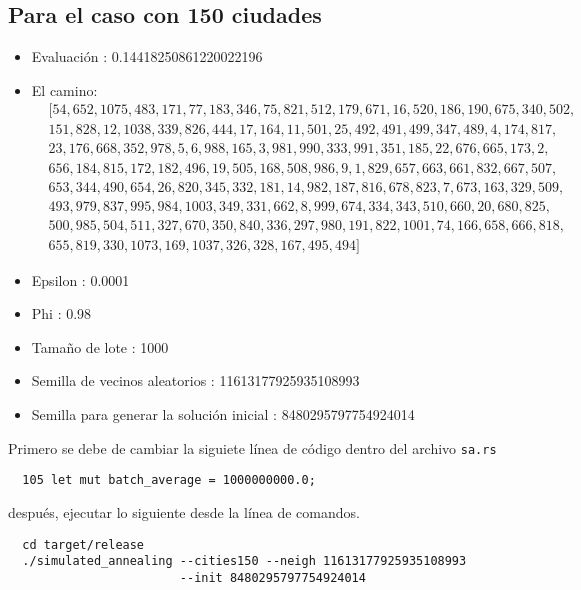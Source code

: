 \documentclass[a4paper]{article}
\begin{document}
\subsection*{Para el caso con 150 ciudades}
\begin{itemize}
\item Evaluaci\'on : 0.14418250861220022196
\item El camino:
  \begin{align*}
    &[54, 652, 1075, 483, 171, 77, 183, 346, 75, 821, 512, 179, 671, 16, 520, 186, 190, 675, 340, 502,\\
    &151, 828, 12, 1038, 339, 826, 444, 17, 164, 11, 501, 25, 492, 491, 499, 347, 489, 4, 174, 817,\\
    &23, 176, 668, 352, 978, 5, 6, 988, 165, 3, 981, 990, 333, 991, 351, 185, 22, 676, 665, 173, 2,\\
    &656, 184, 815, 172, 182, 496, 19, 505, 168, 508, 986, 9, 1, 829, 657, 663, 661, 832, 667, 507,\\
    &653, 344, 490, 654, 26, 820, 345, 332, 181, 14, 982, 187, 816, 678, 823, 7, 673, 163, 329, 509,\\
    &493, 979, 837, 995, 984, 1003, 349, 331, 662, 8, 999, 674, 334, 343, 510, 660, 20, 680, 825,\\
    &500, 985, 504, 511, 327, 670, 350, 840, 336, 297, 980, 191, 822, 1001, 74, 166, 658, 666, 818,\\
    &655, 819, 330, 1073, 169, 1037, 326, 328, 167, 495, 494]
  \end{align*}
  
\item Epsilon : 0.0001
\item Phi : 0.98
\item Tamaño de lote : 1000
\item Semilla de vecinos aleatorios : 11613177925935108993
\item Semilla para generar la soluci\'on inicial : 8480295797754924014
\end{itemize}
Primero se debe de cambiar la siguiete l\'inea de c\'odigo dentro del archivo \texttt{sa.rs}
\begin{lstlisting}
  105 let mut batch_average = 1000000000.0;
\end{lstlisting}

despu\'es, ejecutar lo siguiente desde la l\'inea de comandos.
\begin{lstlisting}
  cd target/release
  ./simulated_annealing --cities150 --neigh 11613177925935108993
                        --init 8480295797754924014
                      \end{lstlisting}
\end{document}
